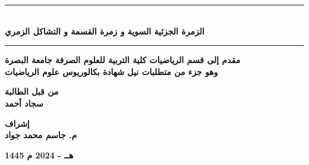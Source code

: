 \begin{titlepage}
	\vspace{1cm}
	
	\begin{center}
		\rule{100mm}{0.5mm}\\
		\vspace{1cm}
		\large \textbf{الزمرة الجزئية السوية و زمرة القسمة و التشاكل الزمري}\\
		\vspace{12pt}
		\rule{100mm}{0.5mm}
	\end{center}
	\vfill
	\begin{center}
		\textbf{مقدم إلى قسم الرياضيات كلية التربية للعلوم الصرفة جامعة البصرة\\
			\vspace{6pt}
			وهو جزء من متطلبات نيل شهادة بكالوريوس علوم الرياضيات}
	\end{center}
	\vfill
	\begin{center}
		\textbf{من قبل الطالبة}\\
		\vspace{8pt}
		\textbf{سجاد أحمد}
	\end{center}
	\vspace{10pt}
	\begin{center}
		\textbf{إشراف}\\
		\vspace{8pt}
		\textbf{م. جاسم محمد جواد}
	\end{center}
	\vspace{10pt}
	\begin{center}
		\textbf{1445 ه‍ــ - 2024 م}
	\end{center}
\end{titlepage}
\restoregeometry
